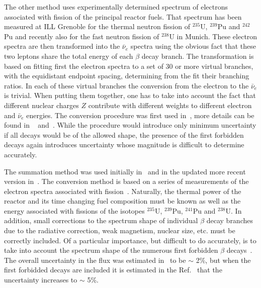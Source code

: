  The other method uses experimentally determined spectrum of electrons associated with fission of the principal reactor fuels. That spectrum has been 
 measured at ILL Grenoble for the thermal neutron fission of $^{235}$U, $^{239}$Pu and $^{242}$Pu and recently also for the fast neutron fission of $^{238}$U
 in Munich. These electron spectra are then transformed into the $\bar{\nu}_e$ spectra using the obvious fact that these two leptons share the total energy
 of each $\beta$ decay branch. The transformation is based on fitting first the electron spectra to a set of 30 or more virtual branches, with the equidistant
 endpoint spacing, determining from the fit their branching ratios. In each of these virtual branches the conversion from the electron to the $\bar{\nu}_e$ is 
 trivial. When putting them together, one has to take into account the fact that different nuclear charges $Z$ contribute with different weights to different electron
 and $\bar{\nu}_e$ energies. The conversion procedure was first used in~\cite{vonFeilitzsch,Schreckenbach,Hahn}, more details can be found in
~\cite{Vogel07} and~\cite{Huber}.
 While the procedure would introduce only minimum uncertainty if all decays would be of the allowed shape, the presence
 of the first forbidden decays again introduces uncertainty whose magnitude is difficult to determine accurately.

The summation method was used
initially in~\cite{Davis,Vogel81,Klapdor-Pu,Klapdor-U,Kopeikin} and in the updated more recent version in~\cite{Mueller, Huber}. The conversion method is based on a series
of measurements of the electron spectra associated with fission~\cite{vonFeilitzsch,Schreckenbach,Hahn,Haag}. Naturally, the thermal power of the reactor
and its time changing fuel composition must be known as well as the energy associated with fissions of the isotopes $^{235}$U, $^{239}$Pu, $^{241}$Pu
and $^{238}$U. In addition, small corrections to the spectrum shape of individual $\beta$ decay branches due to the radiative correction, weak magnetism,
nuclear size,
etc. must be correctly included. Of a particular importance, but difficult to do accurately, is to take into account the spectrum shape of the numerous
first forbidden $\beta$ decays~\cite{Hayes}. The overall uncertainty in the flux was estimated in~\cite{Mueller, Huber} to be $\sim$ 2\%, but when the
first forbidded decays are included it is estimated in the Ref.~\cite{Hayes} that the uncertainty increases to $\sim$ 5\%.


